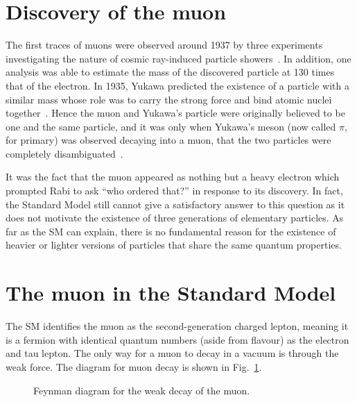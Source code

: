 \section{Discovery of the muon}
The first traces of muons were observed around 1937 by three experiments
investigating the nature of cosmic ray-induced particle
showers~\cite{PhysRev.51.884, PhysRev.52.1198, PhysRev.52.1003}. 
In addition, one analysis was able to estimate the mass of the discovered
particle at 130 times that of the electron. 
In 1935, Yukawa predicted the existence of a particle with a similar mass whose role
was to carry the strong force and bind atomic nuclei
together~\cite{10.1143/PTPS.1.1}. Hence the muon and Yukawa's particle were
originally believed to be one and the same particle, and it was only when
Yukawa's meson (now called $\pi$, for primary) was observed decaying into a muon,
that the two particles were completely disambiguated~\cite{LATTES1947}.

It was the fact that the muon appeared as nothing but a heavy electron which
prompted Rabi to ask ``who ordered that?'' in response to its discovery. In
fact, the Standard Model still cannot give a satisfactory answer to this
question as it does not motivate the existence of three generations of
elementary particles. As far as the SM can explain, there is no fundamental reason
for the existence of heavier or lighter versions of particles that share the
same quantum properties.

\section{The muon in the Standard Model}
The SM identifies the muon as the second-generation charged lepton, meaning it
is a fermion with identical quantum numbers (aside from flavour) as the electron
and tau lepton. The only way for a muon to decay in a vacuum is through the weak
force. The diagram for muon decay is shown in Fig.~\ref{fig:weak_decay}.

\begin{figure}
    \centering
    \caption{Feynman diagram for the weak decay of the muon.}
    \label{fig:weak_decay}
\end{figure}





\cite{PhysRevLett.126.141801} %

\cite{lhcbcollaboration2021test} %




